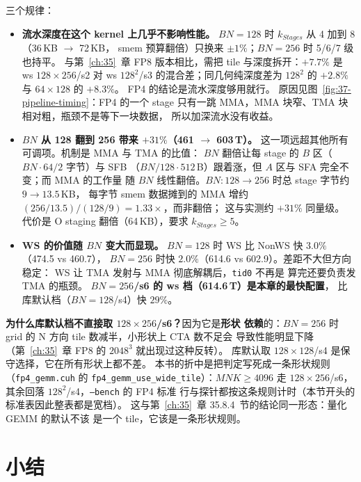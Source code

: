 三个规律：

\begin{itemize}[itemsep=2pt,topsep=3pt]
  \item \textbf{流水深度在这个 kernel 上几乎不影响性能。}
        $BN{=}128$ 时 $k_{Stages}$ 从 4 加到 8（36\,KB $\to$ 72\,KB，
        smem 预算翻倍）只换来 $\pm1\%$；$BN{=}256$ 时 5/6/7 级也持平。
        与第~\ref{ch:35}~章 FP8 版本相比，需把 tile 与深度拆开：$+7.7\%$
        是 ws $128\times256$/s2 对 ws $128^2$/s3 的混合差；同几何纯深度差为
        $128^2$ 的 $+2.8\%$ 与 $64\times128$ 的 $+8.3\%$。
        FP4 的结论是流水深度够用就行。
        原因见图~\ref{fig:37-pipeline-timing}：FP4 的一个 stage
        只有一跳 MMA，MMA 块窄、TMA 块相对粗，瓶颈不是等下一块数据，
        所以加深流水没有收益。
  \item \textbf{$BN$ 从 128 翻到 256 带来 $+31\%$（461 $\to$ 603\,T）。}
        这一项远超其他所有可调项。机制是 MMA 与 TMA 的比值：
        $BN$ 翻倍让每 stage 的 $B$ 区（$BN{\cdot}64/2$ 字节）与 SFB
        （$BN/128\cdot512$\,B）跟着涨，但 $A$ 区与 SFA 完全不变；而 MMA 的工作量
        随 $BN$ 线性翻倍。$BN:128\to256$ 时总 stage 字节约 $9\to13.5$\,KB，
        每字节 smem 数据摊到的 MMA 增约 $(256/13.5)/(128/9)=1.33\times$，而非翻倍；
        这与实测约 $+31\%$ 同量级。
        代价是 O staging 翻倍（64\,KB），要求 $k_{Stages}\ge5$。
  \item \textbf{WS 的价值随 $BN$ 变大而显现。}
        $BN{=}128$ 时 WS 比 NonWS 快 $3.0\%$（474.5 vs 460.7），
        $BN{=}256$ 时快 $2.0\%$（614.6 vs 602.9）。差距不大但方向稳定：
        WS 让 TMA 发射与 MMA 彻底解耦后，\texttt{tid0} 不再是
        算完还要负责发 TMA 的瓶颈。
        \textbf{$BN{=}256$/s6 的 ws 档（614.6\,T）是本章的最快配置}，
        比库默认档（$BN{=}128$/s4）快 $29\%$。
\end{itemize}

\textbf{为什么库默认档不直接取 $128\times256$/s6？}因为它是\textbf{形状
依赖}的：$BN{=}256$ 时 grid 的 N 方向 tile 数减半，小形状上 CTA 数不足会
导致性能明显下降（第~\ref{ch:35}~章 FP8 的 $2048^3$ 就出现过这种反转）。
库默认取 $128\times128$/s4 是保守选择，它在所有形状上都不差。
本书的折中是把判定写死成一条形状规则（\texttt{fp4\_gemm.cuh} 的
\texttt{fp4\_gemm\_\allowbreak use\_wide\_tile}）：$MNK\ge4096$ 走
$128\times256$/s6，其余回落 $128^2$/s4，\texttt{--bench} 的 FP4 标准
行与探针都按这条规则计时（本节开头的标准表因此整表都是宽档）。
这与第~\ref{ch:35}~章 35.8.4~节的结论同一形态：量化 GEMM 的默认不该
是一个 tile，它该是一条形状规则。

\section{小结}

